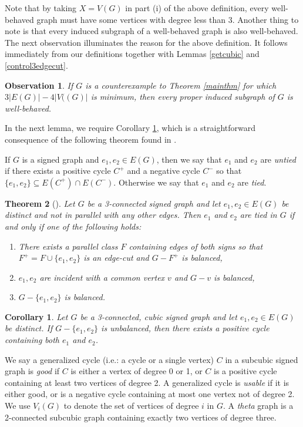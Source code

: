 \documentclass[12pt]{article}
\newtheorem{theorem}{Theorem}[]
\newtheorem{corollary}{Corollary}[theorem]
\newtheorem{observation}[theorem]{Observation}
\begin{document}
Note that by taking $X = V(G)$ in part (i) of the above definition, every well-behaved graph must have some vertices with degree less than 3. Another thing to note is that every induced subgraph of a well-behaved graph is also well-behaved. The next observation illuminates the reason for the above definition.  It follows immediately from our definitions together with Lemmas \ref{getcubic} and \ref{control3edgecut}.  

\begin{observation}\label{obs:well-behaved}
    If $G$ is a counterexample to Theorem \ref{mainthm} for which $3|E(G)| - 4|V((G)|$ is minimum, then every proper induced subgraph of $G$ is well-behaved.  
\end{observation}

In the next lemma, we require Corollary \ref{thm: fromTied}, which is a straightforward consequence of the following theorem found in \cite{devos2023cycles}.

If $G$ is a signed graph and $e_1, e_2 \in E(G)$, then we say that $e_1$ and $e_2$ are \emph{untied} if there exists a positive cycle $C^+$ and a negative cycle $C^-$ so that $\{e_1, e_2\} \subseteq E(C^+) \cap E(C^-)$. Otherwise we say that $e_1$ and $e_2$ are \emph{tied}.

\begin{theorem}[\cite{devos2023cycles}]
\label{main}
Let $G$ be a 3-connected signed graph and let $e_1,e_2 \in E(G)$ be distinct and not in parallel with any other edges.  Then $e_1$ and $e_2$ are tied in $G$ if and only if one of the following holds:
\begin{enumerate}
\item There exists a parallel class $F$ containing edges of both signs so that $F^+ = F \cup \{e_1, e_2\}$ is an edge-cut and $G - F^+$ is balanced,
\item $e_1, e_2$ are incident with a common vertex $v$ and $G-v$ is balanced,
\item $G - \{e_1, e_2\}$ is balanced.
\end{enumerate}
\end{theorem}

\begin{corollary}
\label{thm: fromTied}
    Let $G$ be a 3-connected, cubic signed graph and let $e_1,e_2 \in E(G)$ be distinct. If $G-\{e_1,e_2\}$ is unbalanced, then there exists a positive cycle containing both $e_1$ and $e_2$.
\end{corollary}

We say a generalized cycle (i.e.: a cycle or a single vertex) $C$ in a subcubic signed graph is \emph{good} if $C$ is either a vertex of degree 0 or 1, or $C$ is a positive cycle containing at least two vertices of degree 2.  A generalized cycle is \emph{usable} if it is either good, or is a negative cycle containing at most one vertex not of degree 2. We use $V_i(G)$ to denote the set of vertices of degree $i$ in $G$. A \emph{theta} graph is a 2-connected subcubic graph containing exactly two vertices of degree three.
\end{document}
